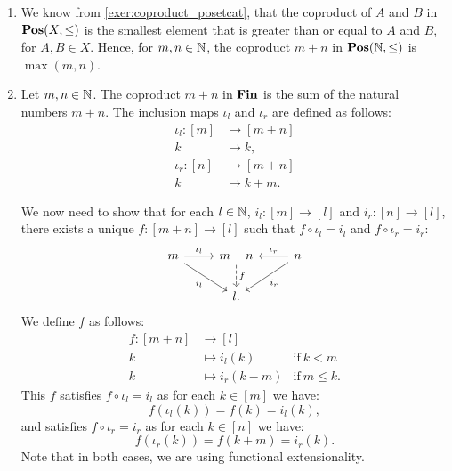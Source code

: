 \begin{solution}\label{sol:coproduct_cats_of_nats}
	\begin{enumerate}
		\item We know from \cref{exer:coproduct_posetcat}, that the coproduct of $A$ and $B$ in $\mathbf{Pos}(X,\leq)$ is the smallest element that is greater than or equal to $A$ and $B$, for $A,B \in X$.
		Hence, for $m,n \in \mathbb{N}$, the coproduct $m + n$ in $\mathbf{Pos}(\mathbb{N},\leq)$ is $\max(m,n)$.
		\item Let $m,n \in \mathbb{N}$. The coproduct $m + n$ in $\mathbf{Fin}$ is the sum of the natural numbers $m + n$. The inclusion maps $\iota_l$ and $\iota_r$ are defined as follows:
		\begin{align*}
			\iota_l : [m] &\to [m + n] \\
			k &\mapsto k, \\
			\iota_r : [n] &\to [m + n] \\
			k &\mapsto k + m.
		\end{align*}

		We now need to show that for each $l \in \mathbb{N}$, $i_l : [m] \to [l]$ and $i_r : [n] \to [l]$, there exists a unique $f : [m + n] \to [l]$ such that $f \circ \iota_l = i_l$ and $f \circ \iota_r = i_r$:
		\[
			\begin{tikzcd}
			  m \ar[r, "\inl"] \ar[rd, "i_l"']
			  &
			  m + n  \ar[d, dashed, "f"]
			  &
			  n \ar[l, "\inr"'] \ar[ld, "i_r"]
			  \\
			  &
			  l.
			\end{tikzcd}
		\]
		We define $f$ as follows: 
		\begin{align*}
			f : [m+n] & \to  [l] \\
			k & \mapsto i_l(k) & \mathrm{if~} k < m \\
			k & \mapsto i_r(k - m)  & \mathrm{if~} m \leq k.
		\end{align*}	
		This $f$ satisfies $f \circ \iota_l = i_l$ as for each $k \in [m]$ we have:
		\[ f (\iota_l(k)) = f(k) = i_l(k),\]
		and satisfies $f \circ \iota_r =  i_r$ as for each $k \in [n]$ we have:
		\[ f(\iota_r (k)) = f(k + m) = i_r(k).\]
		Note that in both cases, we are using functional extensionality.


\end{enumerate}
\end{solution}
